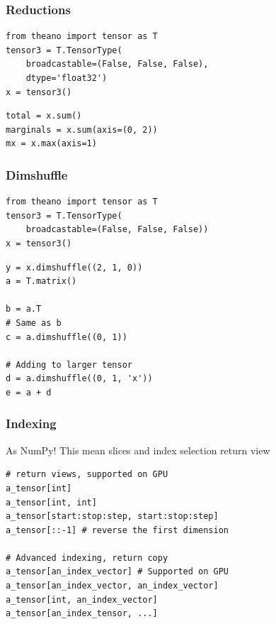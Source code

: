 \documentclass[utf8x,xcolor=pdftex,dvipsnames,table]{beamer}
\begin{document}
\begin{frame}[fragile]
  \frametitle{Reductions}
\begin{lstlisting}
from theano import tensor as T
tensor3 = T.TensorType(
    broadcastable=(False, False, False),
    dtype='float32')
x = tensor3()
\end{lstlisting}

\begin{lstlisting}
total = x.sum()
marginals = x.sum(axis=(0, 2))
mx = x.max(axis=1)
\end{lstlisting}
\end{frame}

\begin{frame}[fragile]
  \frametitle{Dimshuffle}

\begin{lstlisting}
from theano import tensor as T
tensor3 = T.TensorType(
    broadcastable=(False, False, False))
x = tensor3()
\end{lstlisting}
\begin{lstlisting}
y = x.dimshuffle((2, 1, 0))
a = T.matrix()

b = a.T
# Same as b
c = a.dimshuffle((0, 1))

# Adding to larger tensor
d = a.dimshuffle((0, 1, 'x'))
e = a + d
\end{lstlisting}
\end{frame}

\begin{frame}[fragile]
  \frametitle{Indexing}
  As NumPy!
  This mean slices and index selection return view
\begin{lstlisting}
# return views, supported on GPU
a_tensor[int]
a_tensor[int, int]
a_tensor[start:stop:step, start:stop:step]
a_tensor[::-1] # reverse the first dimension

# Advanced indexing, return copy
a_tensor[an_index_vector] # Supported on GPU
a_tensor[an_index_vector, an_index_vector]
a_tensor[int, an_index_vector]
a_tensor[an_index_tensor, ...]
\end{lstlisting}
\end{frame}
\end{document}
